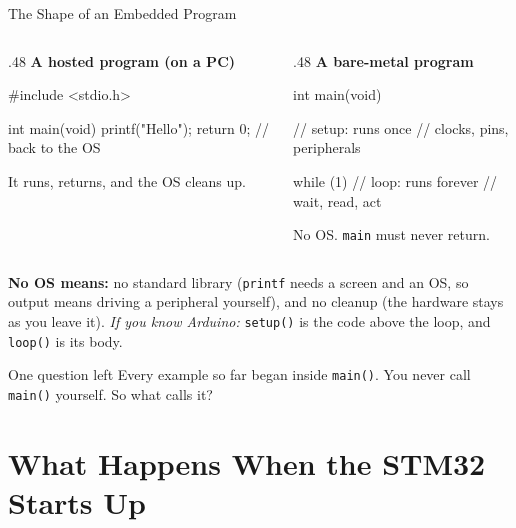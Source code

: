 \documentclass[9pt,aspectratio=169,xcolor=table]{beamer}
\begin{document}
\begin{frame}[fragile]{The Shape of an Embedded Program}
    \begin{columns}[T]
    \begin{column}{.48\textwidth}
        \textbf{A hosted program (on a PC)}
\begin{cc}[basicstyle=\ttfamily\footnotesize]
#include <stdio.h>

int main(void) {
    printf("Hello\n");
    return 0;   // back to the OS
}
\end{cc}
\vspace{1mm}
        {\small It runs, returns, and the OS cleans up.}
    \end{column}
    \begin{column}{.48\textwidth}
        \textbf{A bare-metal program}
\begin{cc}[basicstyle=\ttfamily\footnotesize]
int main(void) {
    // setup: runs once
    //   clocks, pins, peripherals

    while (1) {
        // loop: runs forever
        //   wait, read, act
    }
}
\end{cc}
\vspace{1mm}
        {\small No OS. \texttt{main} must never return.}
    \end{column}
    \end{columns}

    {\small \textbf{No OS means:} \alert{no standard library} (\texttt{printf} needs a screen and an OS, so output means driving a peripheral yourself), and \alert{no cleanup} (the hardware stays as you leave it). \emph{If you know Arduino:} \texttt{setup()} is the code above the loop, and \texttt{loop()} is its body.}

    \vspace{1mm}
    \begin{block}{One question left}
        Every example so far began inside \texttt{main()}. You never
        call \texttt{main()} yourself. \alert{So what calls it?}
    \end{block}
\end{frame}


\section{What Happens When the STM32 Starts Up}
\end{document}
